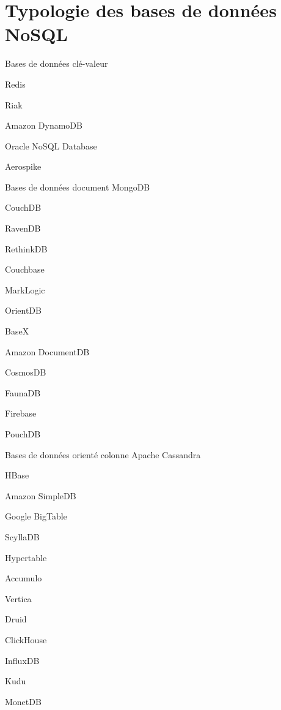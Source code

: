 \section{Typologie des bases de données NoSQL}

\begin{frame}{Bases de données clé-valeur}

    Redis

    Riak

    Amazon DynamoDB

    Oracle NoSQL Database

    Aerospike

\end{frame}

\begin{frame}{Bases de données document}
    MongoDB

    CouchDB

    RavenDB

    RethinkDB

    Couchbase

    MarkLogic

    OrientDB

    BaseX

    Amazon DocumentDB

    CosmosDB

    FaunaDB

    Firebase

    PouchDB

\end{frame}

\begin{frame}{Bases de données orienté colonne}
    Apache Cassandra

    HBase

    Amazon SimpleDB

    Google BigTable

    ScyllaDB

    Hypertable

    Accumulo

    Vertica

    Druid

    ClickHouse

    InfluxDB

    Kudu

    MonetDB
\end{frame}

